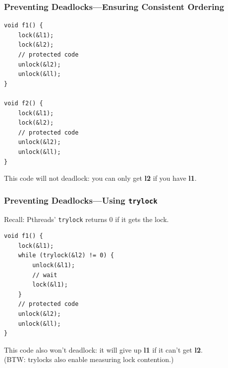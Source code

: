 \documentclass[aspectratio=43]{beamer}
\newenvironment{changemargin}[1]{%
  \begin{list}{}{%
    \setlength{\topsep}{0pt}%
    \setlength{\leftmargin}{#1}%
    \setlength{\rightmargin}{1em}
    \setlength{\listparindent}{\parindent}%
    \setlength{\itemindent}{\parindent}%
    \setlength{\parsep}{\parskip}%
  }%
  \item[]}{\end{list}}
\begin{document}
\begin{frame}[fragile]
  \frametitle{Preventing Deadlocks---Ensuring Consistent Ordering}

  \begin{changemargin}{1cm}
  \begin{lstlisting}
void f1() {
    lock(&l1);
    lock(&l2);
    // protected code
    unlock(&l2);
    unlock(&ll);    
}

void f2() {
    lock(&l1);
    lock(&l2);
    // protected code
    unlock(&l2);
    unlock(&ll);    
}
  \end{lstlisting}

     This code will not deadlock: you can only get {\bf l2} if you have
      {\bf l1}.
  \end{changemargin}
\end{frame}

\begin{frame}[fragile]
  \frametitle{Preventing Deadlocks---Using {\tt trylock}}

  \begin{changemargin}{1cm}
  Recall: Pthreads' {\tt trylock} returns 0 if it gets the lock.

  \begin{lstlisting}
void f1() {
    lock(&l1);
    while (trylock(&l2) != 0) {
        unlock(&l1);
        // wait
        lock(&l1);
    }
    // protected code
    unlock(&l2);
    unlock(&ll);    
}
  \end{lstlisting}

    This code also won't deadlock: it will give up {\bf l1} if it can't get
    {\bf l2}.\\[1em]

    (BTW: trylocks also enable measuring lock contention.)

  \end{changemargin}
\end{frame}
\end{document}
